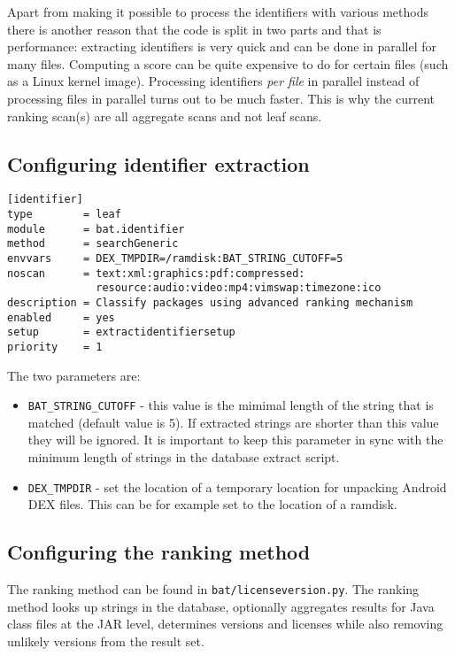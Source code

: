 \documentclass[10pt,a4paper]{article}
\begin{document}
Apart from making it possible to process the identifiers with various methods
there is another reason that the code is split in two parts and that is
performance: extracting identifiers is very quick and can be done in parallel
for many files. Computing a score can be quite expensive to do for certain
files (such as a Linux kernel image). Processing identifiers \textit{per file}
in parallel instead of processing files in parallel turns out to be much faster.
This is why the current ranking scan(s) are all aggregate scans and not leaf
scans.

\subsection{Configuring identifier extraction}

\begin{verbatim}
[identifier]
type        = leaf
module      = bat.identifier
method      = searchGeneric
envvars     = DEX_TMPDIR=/ramdisk:BAT_STRING_CUTOFF=5
noscan      = text:xml:graphics:pdf:compressed:
              resource:audio:video:mp4:vimswap:timezone:ico
description = Classify packages using advanced ranking mechanism
enabled     = yes
setup       = extractidentifiersetup
priority    = 1
\end{verbatim}

The two parameters are:

\begin{itemize}
\item \texttt{BAT\_STRING\_CUTOFF} - this value is the mimimal length of the
string that is matched (default value is 5). If extracted strings are shorter
than this value they will be ignored. It is important to keep this parameter in
sync with the minimum length of strings in the database extract script.
\item \texttt{DEX\_TMPDIR} - set the location of a temporary location for
unpacking Android DEX files. This can be for example set to the location of a
ramdisk.
\end{itemize}

\subsection{Configuring the ranking method}

The ranking method can be found in \texttt{bat/licenseversion.py}. The ranking
method looks up strings in the database, optionally aggregates results for
Java class files at the JAR level, determines versions and licenses while also
removing unlikely versions from the result set.
\end{document}
